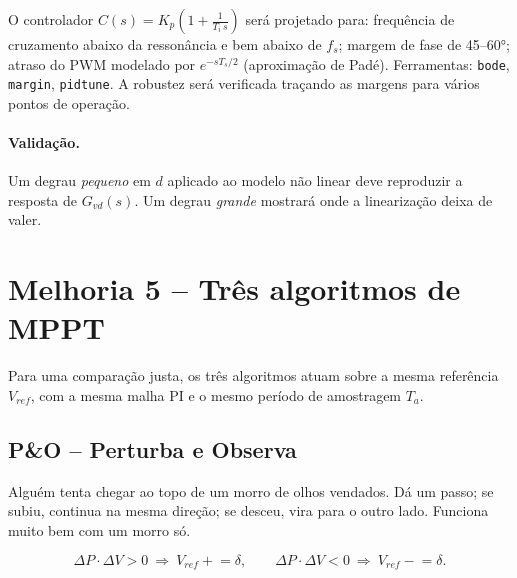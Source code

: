 \documentclass[11pt,a4paper]{article}
\begin{document}
O controlador $C(s)=K_p\left(1+\frac{1}{T_i\,s}\right)$ será projetado para:
frequência de cruzamento abaixo da ressonância e bem abaixo de $f_s$; margem de fase de
45--60°; atraso do PWM modelado por $e^{-sT_s/2}$ (aproximação de Padé). Ferramentas:
\texttt{bode}, \texttt{margin}, \texttt{pidtune}. A robustez será verificada traçando as
margens para vários pontos de operação.

\paragraph{Validação.} Um degrau \emph{pequeno} em $d$ aplicado ao modelo não linear deve
reproduzir a resposta de $G_{vd}(s)$. Um degrau \emph{grande} mostrará onde a linearização
deixa de valer.

\section{Melhoria 5 -- Três algoritmos de MPPT}

Para uma comparação justa, os três algoritmos atuam sobre a mesma referência $V_{ref}$, com
a mesma malha PI e o mesmo período de amostragem $T_a$.

\subsection{P\&O -- Perturba e Observa}

\begin{intuicao}
Alguém tenta chegar ao topo de um morro de olhos vendados. Dá um passo; se subiu, continua
na mesma direção; se desceu, vira para o outro lado. Funciona muito bem com um morro só.
\end{intuicao}

\begin{equation}
\Delta P\cdot\Delta V > 0 \ \Rightarrow\ V_{ref} \mathrel{+}= \delta, \qquad
\Delta P\cdot\Delta V < 0 \ \Rightarrow\ V_{ref} \mathrel{-}= \delta.
\end{equation}
\end{document}
